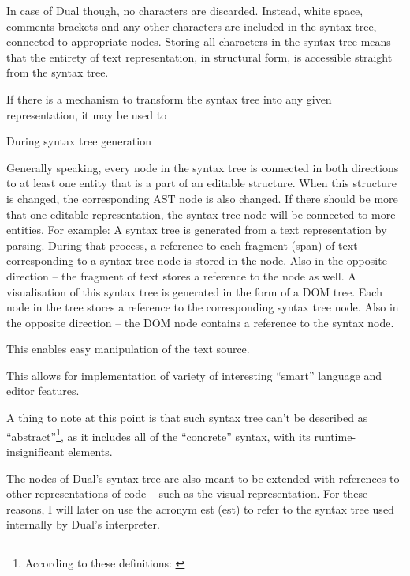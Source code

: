 In case of Dual though, no characters are discarded. Instead, white space, comments brackets and any other characters are included in the syntax tree, connected to appropriate nodes. Storing all characters in the syntax tree means that the entirety of text representation, in structural form, is accessible straight from the syntax tree.


If there is a mechanism to transform the syntax tree into any given representation, it may be used to 

During syntax tree generation 

Generally speaking, every node in the syntax tree is connected in both directions to at least one entity that is a part of an editable structure. When this structure is changed, the corresponding AST node is also changed. If there should be more that one editable representation, the syntax tree node will be connected to more entities. For example:
A syntax tree is generated from a text representation by parsing. During that process, a reference to each fragment (span) of text corresponding to a syntax tree node is stored in the node. Also in the opposite direction -- the fragment of text stores a reference to the node as well.
A visualisation of this syntax tree is generated in the form of a DOM tree. Each node in the tree stores a reference to the corresponding syntax tree node. Also in the opposite direction -- the DOM node contains a reference to the syntax node.






This enables easy manipulation of the text source.


This allows for implementation of variety of interesting ``smart'' language and editor features.

A thing to note at this point is that such syntax tree can't be described as
``abstract''\footnote{According to these definitions: \cite{ast_wikipedia, c2_ast}}, as it includes all of the ``concrete'' syntax, with its runtime-insignificant elements.

The nodes of Dual's syntax tree are also meant to be extended with references to other representations of code -- such as the visual representation. For these reasons, I will later on use the acronym \acrshort{est} (\acrlong{est}) to refer to the syntax tree used internally by Dual's interpreter.

